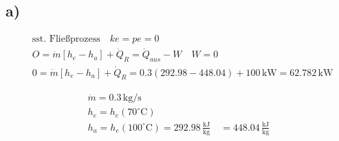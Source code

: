 

\subsection*{a)}

\begin{align*}
&\text{sst. Fließprozess} \quad ke = pe = 0 \\
&O = \dot{m} [h_e - h_a] + \dot{Q}_R = \dot{Q}_{aus} - W \quad W = 0 \\
&0 = \dot{m} [h_e - h_a] + \dot{Q}_R = 0.3 \left( 292.98 - 448.04 \right) + 100 \, \text{kW} = 62.782 \, \text{kW}
\end{align*}

\begin{align*}
\dot{m} = 0.3 \, \text{kg/s} \\
h_e = h_e (70^\circ \text{C}) \\
h_a = h_e (100^\circ \text{C}) = 292.98 \, \frac{\text{kJ}}{\text{kg}} \quad = 448.04 \, \frac{\text{kJ}}{\text{kg}}
\end{align*}